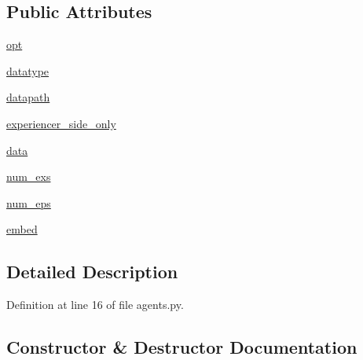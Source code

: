 \subsection*{Public Attributes}
\begin{DoxyCompactItemize}
\item 
\hyperlink{classparlai_1_1tasks_1_1empathetic__dialogues_1_1agents_1_1EmpatheticDialoguesTeacher_aee4f5fe7a72beed0da64501c3b2f98d2}{opt}
\item 
\hyperlink{classparlai_1_1tasks_1_1empathetic__dialogues_1_1agents_1_1EmpatheticDialoguesTeacher_a8e5e84ed84bf7108b3163a3ed66b94e0}{datatype}
\item 
\hyperlink{classparlai_1_1tasks_1_1empathetic__dialogues_1_1agents_1_1EmpatheticDialoguesTeacher_a7d08e7936a5756d2d920a570429f5210}{datapath}
\item 
\hyperlink{classparlai_1_1tasks_1_1empathetic__dialogues_1_1agents_1_1EmpatheticDialoguesTeacher_a6fb17fadf27046a3bb35e6ff08fcdcff}{experiencer\+\_\+side\+\_\+only}
\item 
\hyperlink{classparlai_1_1tasks_1_1empathetic__dialogues_1_1agents_1_1EmpatheticDialoguesTeacher_a92f5706842329526e55dcc9e1678303c}{data}
\item 
\hyperlink{classparlai_1_1tasks_1_1empathetic__dialogues_1_1agents_1_1EmpatheticDialoguesTeacher_ae78908243a566c47949d3da235055cba}{num\+\_\+exs}
\item 
\hyperlink{classparlai_1_1tasks_1_1empathetic__dialogues_1_1agents_1_1EmpatheticDialoguesTeacher_a7dde29c0002ddbc7a636cfa53224f23c}{num\+\_\+eps}
\item 
\hyperlink{classparlai_1_1tasks_1_1empathetic__dialogues_1_1agents_1_1EmpatheticDialoguesTeacher_a25e89c21c42ea3701cde62fbe61352f8}{embed}
\end{DoxyCompactItemize}


\subsection{Detailed Description}


Definition at line 16 of file agents.\+py.



\subsection{Constructor \& Destructor Documentation}
\mbox{\label{classparlai_1_1tasks_1_1empathetic__dialogues_1_1agents_1_1EmpatheticDialoguesTeacher_a415f18d0a456b1fea4eec78ee0eba1b5}} 
